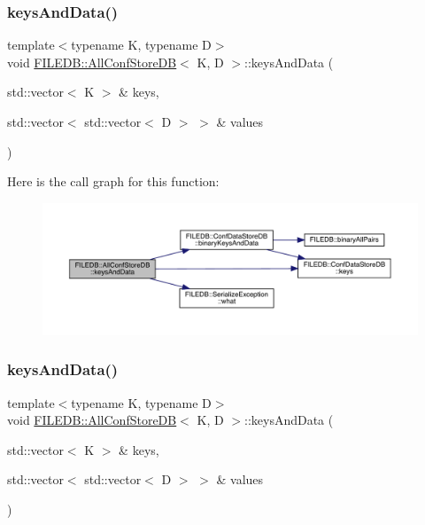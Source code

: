 \subsubsection{\texorpdfstring{keysAndData()}{keysAndData()}\hspace{0.1cm}{\footnotesize\ttfamily [1/2]}}
{\footnotesize\ttfamily template$<$typename K, typename D$>$ \\
void \mbox{\hyperlink{classFILEDB_1_1AllConfStoreDB}{F\+I\+L\+E\+D\+B\+::\+All\+Conf\+Store\+DB}}$<$ K, D $>$\+::keys\+And\+Data (\begin{DoxyParamCaption}\item[{std\+::vector$<$ K $>$ \&}]{keys,  }\item[{std\+::vector$<$ std\+::vector$<$ D $>$ $>$ \&}]{values }\end{DoxyParamCaption})\hspace{0.3cm}{\ttfamily [inline]}}

Here is the call graph for this function\+:
\nopagebreak
\begin{figure}[H]
\begin{center}
\leavevmode
\includegraphics[width=350pt]{df/db6/classFILEDB_1_1AllConfStoreDB_a9150983c712d6b870a75886f92b10a9d_cgraph}
\end{center}
\end{figure}
\mbox{\label{classFILEDB_1_1AllConfStoreDB_a9150983c712d6b870a75886f92b10a9d}} 
\subsubsection{\texorpdfstring{keysAndData()}{keysAndData()}\hspace{0.1cm}{\footnotesize\ttfamily [2/2]}}
{\footnotesize\ttfamily template$<$typename K, typename D$>$ \\
void \mbox{\hyperlink{classFILEDB_1_1AllConfStoreDB}{F\+I\+L\+E\+D\+B\+::\+All\+Conf\+Store\+DB}}$<$ K, D $>$\+::keys\+And\+Data (\begin{DoxyParamCaption}\item[{std\+::vector$<$ K $>$ \&}]{keys,  }\item[{std\+::vector$<$ std\+::vector$<$ D $>$ $>$ \&}]{values }\end{DoxyParamCaption})\hspace{0.3cm}{\ttfamily [inline]}}


